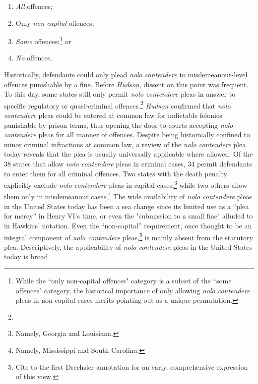 \begin{enumerate}
\item \textit{All} offences;
\item Only \textit{non-capital} offences;
\item \textit{Some} offences;\footnote{While the ``only non-capital offences" category is a subset of the ``some offences" category, the historical importance of only allowing \textit{nolo contendere} pleas in non-capital cases merits pointing out as a unique permutation.} or
\item \textit{No} offences.%
\end{enumerate}

Historically, defendants could only plead \textit{nolo contendere} to misdemeanour-level offences punishable by a fine. Before \textit{Hudson}, dissent on this point was frequent. To this day, some states still only permit \textit{nolo contendere} pleas in answer to specific regulatory or quasi-criminal offences.\footnote{} \textit{Hudson} confirmed that \textit{nolo contendere} pleas could be entered at common law for indictable felonies punishable by prison terms, thus opening the door to courts accepting \textit{nolo contendere} pleas for all manner of offences. Despite being historically confined to minor criminal infractions at common law, a review of the \textit{nolo contendere} plea today reveals that the plea is usually universally applicable where allowed. Of the 38 states that allow \textit{nolo contendere} pleas in criminal cases, 34 permit defendants to enter them for all criminal offences. Two states with the death penalty explicitly exclude \textit{nolo contendere} pleas in capital cases,\footnote{Namely, Georgia and Louisiana.} while two others allow them only in misdemeanour cases.\footnote{Namely, Mississippi and South Carolina.} The wide availability of \textit{nolo contendere} pleas in the United States today has been a sea change since its limited use as a ``plea for mercy'' in Henry VI's time, or even the "submission to a small fine" alluded to in Hawkins' notation. Even the ``non-capital'' requirement, once thought to be an integral component of \textit{nolo contendere} pleas,\footnote{Cite to the first Drechsler annotation for an early, comprehensive expression of this view.} is mainly absent from the statutory plea. Descriptively, the applicability of \textit{nolo contendere} pleas in the United States today is broad.

